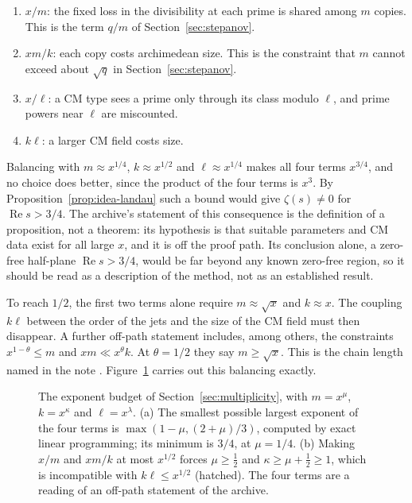\documentclass[11pt]{amsbook}
\theoremstyle{plain}
\theoremstyle{definition}
\theoremstyle{remark}
\numberwithin{equation}{section}
\numberwithin{figure}{chapter}
\numberwithin{table}{chapter}
\begin{document}
\begin{enumerate}[label=(\roman*)]
\item $x/m$: the fixed loss in the divisibility at each prime is
shared among $m$ copies. This is the term $q/m$ of
Section~\ref{sec:stepanov}.
\item $xm/k$: each copy costs archimedean size. This is the
constraint that $m$ cannot exceed about $\sqrt q$ in
Section~\ref{sec:stepanov}.
\item $x/\ell$: a CM type sees a prime only through its class
modulo $\ell$, and prime powers near $\ell$ are miscounted.
\item $k\ell$: a larger CM field costs size.
\end{enumerate}

Balancing with $m \approx x^{1/4}$, $k \approx x^{1/2}$ and
$\ell \approx x^{1/4}$ makes all four terms $x^{3/4}$, and no choice
does better, since the product of the four terms is $x^3$. By
Proposition~\ref{prop:idea-landau} such a bound would give
$\zeta(s) \ne 0$ for $\operatorname{Re} s > 3/4$. The archive's
statement of this consequence is the definition of a proposition,
not a theorem: its hypothesis is that suitable parameters and CM
data exist for all large $x$, and it is off the proof path. Its
conclusion alone, a zero-free half-plane
$\operatorname{Re} s > 3/4$, would be far beyond any known zero-free
region, so it should be read as a description of the method, not as
an established result.

To reach $1/2$, the first two terms alone require
$m \approx \sqrt x$ and $k \approx x$. The coupling $k\ell$ between
the order of the jets and the size of the CM field must then
disappear. A further off-path statement
\cite[\nolinkurl{Formalism/HalfLinks/Statement.lean}]
{AlpogeArchive2026} includes, among others, the constraints
$x^{1-\theta} \le m$ and $xm \ll x^\theta k$. At $\theta = 1/2$ they
say $m \ge \sqrt x$. This is the chain length named in the note
\cite[p.~1]{AlpogeRemark2026}. Figure~\ref{fig:exponent-budget}
carries out this balancing exactly.
\begin{figure}[tbp]
\centering
{}
\caption{The exponent budget of Section~\ref{sec:multiplicity}, with
$m=x^\mu$, $k=x^\kappa$ and $\ell=x^\lambda$. (a) The smallest
possible largest exponent of the four terms is
$\max(1-\mu,(2+\mu)/3)$, computed by exact linear programming; its
minimum is $3/4$, at $\mu=1/4$. (b) Making $x/m$ and $xm/k$ at most
$x^{1/2}$ forces $\mu\ge\frac12$ and $\kappa\ge\mu+\frac12\ge1$,
which is incompatible with $k\ell\le x^{1/2}$ (hatched). The four
terms are a reading of an off-path statement of the archive.}
\label{fig:exponent-budget}
\end{figure}
\end{document}
